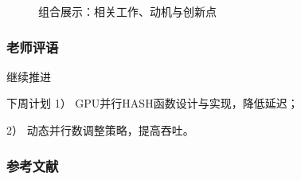 \documentclass[slide]{../../custom}
\begin{document}
\begin{frame}
\begin{figure}[ht]
    \caption{组合展示：相关工作、动机与创新点}
    \label{fig:composite}
  \end{figure}
\end{frame}

\begin{frame}
  \frametitle{老师评语}

  \begin{alertblock}{继续推进}

  \end{alertblock}

  \begin{block}{下周计划}
    1） GPU并行HASH函数设计与实现，降低延迟；

    2） 动态并行数调整策略，提高吞吐。
  \end{block}

\end{frame}

\begin{frame}
  \frametitle{参考文献}
  
  
\end{frame}
\end{document}

